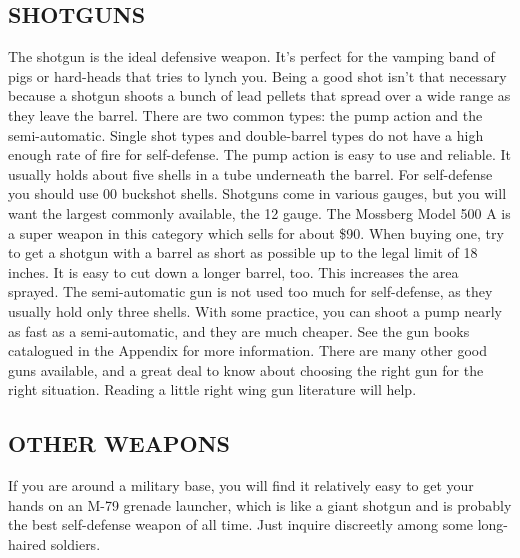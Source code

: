 \documentclass[11pt,twoside,a4paper]{book}
\begin{document}
\subsection{SHOTGUNS}

The shotgun is the ideal defensive weapon. It's perfect for the vamping band of pigs or hard-heads that tries to lynch you. Being a good shot isn't that necessary because a shotgun shoots a bunch of lead pellets that spread over a wide range as they leave the barrel. There are two common types: the pump action and the semi-automatic. Single shot types and double-barrel types do not have a high enough rate of fire for self-defense. The pump action is easy to use and reliable. It usually holds about five shells in a tube underneath the barrel. For self-defense you should use 00 buckshot shells. Shotguns come in various gauges, but you will want the largest commonly available, the 12 gauge. The Mossberg Model 500 A is a super weapon in this category which sells for about \$90. When buying one, try to get a shotgun with a barrel as short as possible up to the legal limit of 18 inches. It is easy to cut down a longer barrel, too. This increases the area sprayed. The semi-automatic gun is not used too much for self-defense, as they usually hold only three shells. With some practice, you can shoot a pump nearly as fast as a semi-automatic, and they are much cheaper. See the gun books catalogued in the Appendix for more information. There are many other good guns available, and a great deal to know about choosing the right gun for the right situation. Reading a little right wing gun literature will help.~\\

\subsection{OTHER WEAPONS}
If you are around a military base, you will find it relatively easy to get your hands on an M-79 grenade launcher, which is like a giant shotgun and is probably the best self-defense weapon of all time. Just inquire discreetly among some long-haired soldiers.~\\
\end{document}
